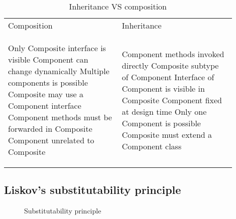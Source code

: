 \begin{table}[!ht]
    \begin{tabular}{p{0.45\linewidth}p{0.45\linewidth}}
        Composition & Inheritance \\
        \begin{minipage}{\linewidth}
            \begin{center}
                
            \end{center}

            \begin{itemize}
                    \proitem{} Only Composite interface is visible
                    \proitem{} Component can change dynamically
                    \proitem{} Multiple components is possible
                    \proitem{} Composite may use a Component
                interface
                \consitem{} Component methods must be forwarded
                in Composite
                \consitem{} Component unrelated to Composite
            \end{itemize}
        \end{minipage}
        &
        \begin{minipage}{\linewidth}
            \begin{center}
                
            \end{center}
            \begin{itemize}
                    \proitem{} Component methods invoked directly
                    \proitem{} Composite subtype of Component
                    \consitem{} Interface of Component is visible in
                Composite
                \consitem{} Component fixed at design time
                \consitem{} Only one Component is possible
                \consitem{} Composite must extend a Component
                class
            \end{itemize}
        \end{minipage}
    \end{tabular}
    \caption{Inheritance VS composition}
\end{table}

\FloatBarrier

\subsection{Liskov’s substitutability principle}

\begin{figure}[!ht]
    \centering
    
    \caption{Substitutability principle}
\end{figure}

